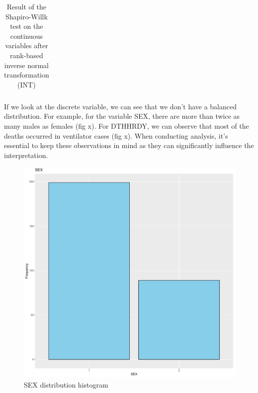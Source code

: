 \documentclass[a4paper, 11pt]{article}
\begin{document}
\begin{multicols}{2}
\begin{table}[H]
\begin{center}
\begin{tabular}{ |c|c|c|c|c|c| }
\end{tabular}
\end{center}
\caption{Result of the Shapiro-Willk test on the continuous variables after rank-based inverse normal transformation (INT) }
\label{tab:Q2FC}
\end{table}


If we look at the discrete variable, we can see that we don't have a balanced distribution. For example, for the variable SEX, there are more than twice as many males as females (fig x). For DTHHRDY, we can observe that most of the deaths occurred in ventilator cases (fig x). When conducting analysis, it's essential to keep these observations in mind as they can significantly influence the interpretation. 

\begin{figure}[H]
	\centering
	\includegraphics[width=\columnwidth]{figures/clinical_data_var_dist/SEX}
	\caption{SEX distribution histogram }
	\label{fig:corCircle}
\end{figure}


\end{multicols}
\end{document}
